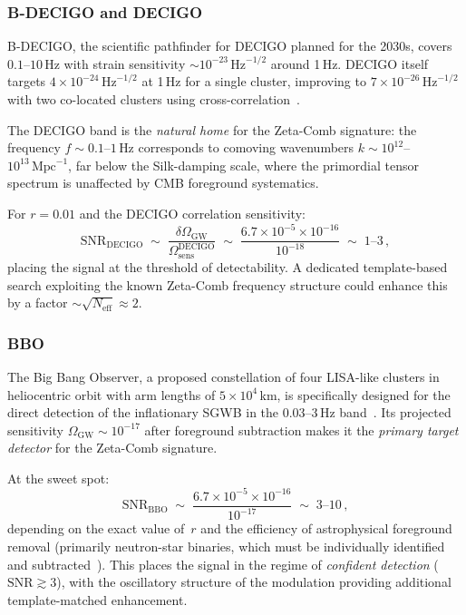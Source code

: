 \documentclass[12pt,a4paper]{article}
\begin{document}
\subsubsection{B-DECIGO and DECIGO}

B-DECIGO, the scientific pathfinder for DECIGO planned
for the 2030s, covers $0.1$--$10\,$Hz with
strain sensitivity $\sim 10^{-23}\,\mathrm{Hz}^{-1/2}$
around 1\,Hz.
DECIGO itself targets
$4\times 10^{-24}\,\mathrm{Hz}^{-1/2}$ at 1\,Hz
for a single cluster, improving to
$7\times 10^{-26}\,\mathrm{Hz}^{-1/2}$ with
two co-located clusters using
cross-correlation~\cite{DECIGO2021,DECIGO2024}.

The DECIGO band is the \emph{natural home} for
the Zeta-Comb signature: the frequency
$f\sim 0.1$--$1\,$Hz corresponds to comoving
wavenumbers $k\sim 10^{12}$--$10^{13}\,\mathrm{Mpc}^{-1}$,
far below the Silk-damping scale, where the
primordial tensor spectrum is unaffected by
CMB foreground systematics.

For $r=0.01$ and the DECIGO correlation sensitivity:
\begin{equation}\label{eq:decigo-snr}
  \mathrm{SNR}_{\mathrm{DECIGO}}
  \;\sim\;
  \frac{\delta\Omega_{\mathrm{GW}}}
       {\Omega_{\mathrm{sens}}^{\mathrm{DECIGO}}}
  \;\sim\;
  \frac{6.7\times 10^{-5}\times 10^{-16}}
       {10^{-18}}
  \;\sim\; 1\text{--}3\,,
\end{equation}
placing the signal at the threshold of detectability.
A dedicated template-based search exploiting the
known Zeta-Comb frequency structure could enhance
this by a factor $\sim\!\sqrt{N_{\mathrm{eff}}}
\approx 2$.


\subsubsection{BBO}

The Big Bang Observer, a proposed
constellation of four LISA-like clusters in
heliocentric orbit with arm lengths of
$5\times 10^4\,$km, is specifically designed for
the direct detection of the inflationary SGWB
in the 0.03--3\,Hz band~\cite{BBO2005,Yagi2011}.
Its projected sensitivity
$\Omega_{\mathrm{GW}}\sim 10^{-17}$ after
foreground subtraction makes it the \emph{primary
target detector} for the Zeta-Comb signature.

At the sweet spot:
\begin{equation}\label{eq:bbo-snr}
  \mathrm{SNR}_{\mathrm{BBO}}
  \;\sim\;
  \frac{6.7\times 10^{-5}\times 10^{-16}}
       {10^{-17}}
  \;\sim\; 3\text{--}10\,,
\end{equation}
depending on the exact value of~$r$ and the
efficiency of astrophysical foreground removal
(primarily neutron-star binaries, which must
be individually identified and
subtracted~\cite{Yagi2011}).
This places the signal in the regime of
\emph{confident detection}
($\mathrm{SNR}\gtrsim 3$), with the oscillatory
structure of the modulation providing additional
template-matched enhancement.
\end{document}
